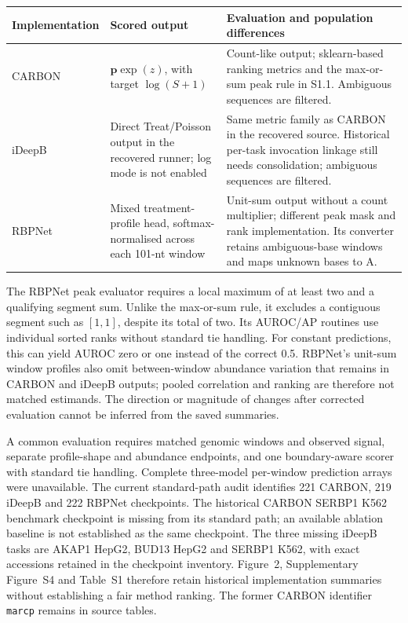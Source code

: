 \documentclass[11pt]{article}
\begin{document}
\begin{center}\small
\begin{tabular}{@{}p{.16\linewidth}p{.35\linewidth}p{.41\linewidth}@{}}
\toprule
Implementation & Scored output & Evaluation and population differences \\
\midrule
CARBON & $\mathbf p\exp(z)$, with target $\log(S+1)$ & Count-like output; sklearn-based ranking metrics and the max-or-sum peak rule in S1.1. Ambiguous sequences are filtered. \\
iDeepB & Direct Treat/Poisson output in the recovered runner; log mode is not enabled & Same metric family as CARBON in the recovered source. Historical per-task invocation linkage still needs consolidation; ambiguous sequences are filtered. \\
RBPNet & Mixed treatment-profile head, softmax-normalised across each 101-nt window & Unit-sum output without a count multiplier; different peak mask and rank implementation. Its converter retains ambiguous-base windows and maps unknown bases to A. \\
\bottomrule
\end{tabular}\end{center}

The RBPNet peak evaluator requires a local maximum of at least two and a qualifying segment sum. Unlike the max-or-sum rule, it excludes a contiguous segment such as $[1,1]$, despite its total of two. Its AUROC/AP routines use individual sorted ranks without standard tie handling. For constant predictions, this can yield AUROC zero or one instead of the correct 0.5. RBPNet's unit-sum window profiles also omit between-window abundance variation that remains in CARBON and iDeepB outputs; pooled correlation and ranking are therefore not matched estimands. The direction or magnitude of changes after corrected evaluation cannot be inferred from the saved summaries.

A common evaluation requires matched genomic windows and observed signal, separate profile-shape and abundance endpoints, and one boundary-aware scorer with standard tie handling. Complete three-model per-window prediction arrays were unavailable. The current standard-path audit identifies 221 CARBON, 219 iDeepB and 222 RBPNet checkpoints. The historical CARBON SERBP1 K562 benchmark checkpoint is missing from its standard path; an available ablation baseline is not established as the same checkpoint. The three missing iDeepB tasks are AKAP1 HepG2, BUD13 HepG2 and SERBP1 K562, with exact accessions retained in the checkpoint inventory. Figure~2, Supplementary Figure~S4 and Table~S1 therefore retain historical implementation summaries without establishing a fair method ranking. The former CARBON identifier \texttt{marcp} remains in source tables.
\end{document}
